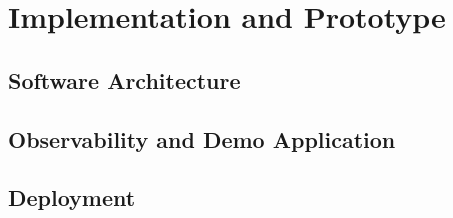 \chapter{Implementation and Prototype}
\label{ch:implementation}


\section{Software Architecture}
\label{sec:sys-architecture}

\section{Observability and Demo Application}
\label{sec:sys-app}

\section{Deployment}
\label{sec:sys-deploy}
